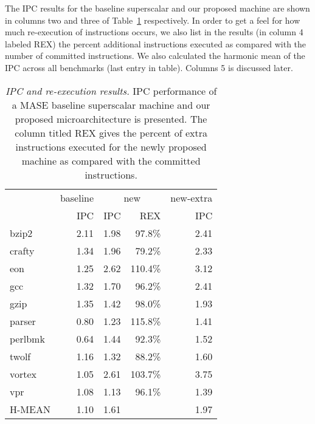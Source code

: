 \documentclass[10pt,dvips]{article}
\begin{document}
The IPC results for the baseline superscalar and our proposed
machine are shown in columns two and three of Table~\ref{tab:results}
respectively.
In order to get a feel for how much re-execution of instructions
occurs, we also list in the results (in column 4 labeled REX)
the percent additional instructions
executed as compared with the number of committed 
instructions.
We also calculated the harmonic mean of the IPC
across all benchmarks (last entry in table).
Columns 5 is discussed later.
%
\begin{table}[t]
\begin{center}
\caption{{\em IPC and re-execution results.}
\small{
IPC performance of a MASE baseline superscalar machine and our
proposed microarchitecture is presented.
The column titled REX gives the percent of 
extra instructions executed for the newly proposed machine as compared with 
the committed instructions.
}
}
\label{tab:results}
\vspace{+0.1in}
\scriptsize {
\begin{tabular}{|l||r|r|r|r|}
\hline
 & baseline &
 \multicolumn{2}{c|}{new} &
 {new-extra} \\
\cline{2-5}
 & IPC & IPC & REX & IPC \\

\hline
\hline
bzip2&
2.11 & 1.98 & 97.8\% & 2.41 \\

\hline
crafty&
1.34 & 1.96 & 79.2\% & 2.33 \\

\hline
eon&
1.25 & 2.62 & 110.4\% & 3.12 \\

\hline
gcc&
1.32 & 1.70 & 96.2\% & 2.41 \\

\hline
gzip&
1.35 & 1.42 & 98.0\% & 1.93 \\

\hline
parser&
0.80 & 1.23 & 115.8\% & 1.41 \\

\hline
perlbmk&
0.64 & 1.44 & 92.3\% & 1.52 \\

\hline
twolf&
1.16 & 1.32 & 88.2\% & 1.60 \\

\hline
vortex&
1.05 & 2.61 & 103.7\% & 3.75 \\

\hline
vpr&
1.08 & 1.13 & 96.1\% & 1.39 \\

\hline
\hline
H-MEAN&
1.10 & 1.61 & & 1.97 \\

\hline
\end{tabular}
}
\end{center}
\end{table}
\end{document}
